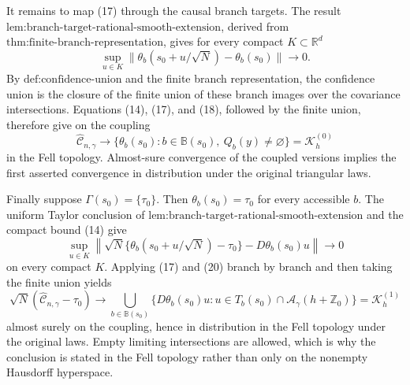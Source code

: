 It remains to map (17) through the causal branch targets. The result \(\text{lem:branch-target-rational-smooth-extension}\), derived from \(\text{thm:finite-branch-representation}\), gives for every compact \(K\subset\mathbb R^d\)
\[
 \sup_{u\in K}
 \|\theta_b(s_0+u/\sqrt N)-\theta_b(s_0)\|
 \longrightarrow0.
 \tag{18}
\]
By \(\text{def:confidence-union}\) and the finite branch representation, the confidence union is the closure of the finite union of these branch images over the covariance intersections. Equations (14), (17), and (18), followed by the finite union, therefore give on the coupling
\[
 \widehat{\mathcal C}_{n,\gamma}\longrightarrow
 \{\theta_b(s_0):b\in\mathbb B(s_0),\ Q_b(y)\ne\varnothing\}
 =\mathcal K_h^{(0)}
 \tag{19}
\]
in the Fell topology. Almost-sure convergence of the coupled versions implies the first asserted convergence in distribution under the original triangular laws.

Finally suppose \(\Gamma(s_0)=\{\tau_0\}\). Then \(\theta_b(s_0)=\tau_0\) for every accessible \(b\). The uniform Taylor conclusion of \(\text{lem:branch-target-rational-smooth-extension}\) and the compact bound (14) give
\[
 \sup_{u\in K}
 \left\|
 \sqrt N\{\theta_b(s_0+u/\sqrt N)-\tau_0\}
 -D\theta_b(s_0)u
 \right\|\longrightarrow0
 \tag{20}
\]
on every compact \(K\). Applying (17) and (20) branch by branch and then taking the finite union yields
\[
 \sqrt N(\widehat{\mathcal C}_{n,\gamma}-\tau_0)
 \longrightarrow
 \bigcup_{b\in\mathbb B(s_0)}
 \{D\theta_b(s_0)u:u\in T_b(s_0)\cap
 \mathcal A_\gamma(h+\mathbb Z_0)\}
 =\mathcal K_h^{(1)}
 \tag{21}
\]
almost surely on the coupling, hence in distribution in the Fell topology under the original laws. Empty limiting intersections are allowed, which is why the conclusion is stated in the Fell topology rather than only on the nonempty Hausdorff hyperspace.